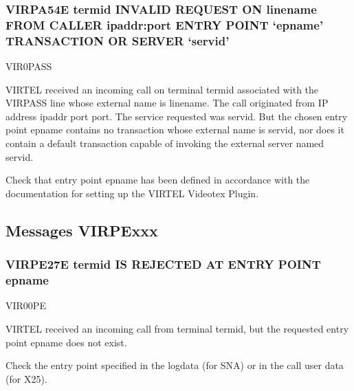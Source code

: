 \documentclass[letterpaper,10pt,english]{sphinxmanual}
\begin{document}
\subsubsection{VIRPA54E termid INVALID REQUEST ON linename FROM CALLER ipaddr:port ENTRY POINT ‘epname’ TRANSACTION OR SERVER ‘servid’}
\label{\detokenize{messages:virpa54e-termid-invalid-request-on-linename-from-caller-ipaddr-port-entry-point-epname-transaction-or-server-servid}}\begin{description}
\sphinxAtStartPar
VIR0PASS

\sphinxAtStartPar
VIRTEL received an incoming call on terminal termid associated with the VIRPASS line whose external name is linename. The call originated from IP address ipaddr port port. The service requested was servid. But the chosen entry point epname contains no transaction whose external name is servid, nor does it contain a default transaction capable of invoking the external server named servid.

\sphinxAtStartPar
Check that entry point epname has been defined in accordance with the documentation for setting up the VIRTEL Videotex Plugin.

\end{description}


\subsection{Messages VIRPExxx}
\label{\detokenize{messages:messages-virpexxx}}

\subsubsection{VIRPE27E termid IS REJECTED AT ENTRY POINT epname}
\label{\detokenize{messages:virpe27e-termid-is-rejected-at-entry-point-epname}}\begin{description}
\sphinxAtStartPar
VIR00PE

\sphinxAtStartPar
VIRTEL received an incoming call from terminal termid, but the requested entry point epname does not exist.

\sphinxAtStartPar
Check the entry point specified in the logdata (for SNA) or in the call user data (for X25).

\end{description}
\end{document}
